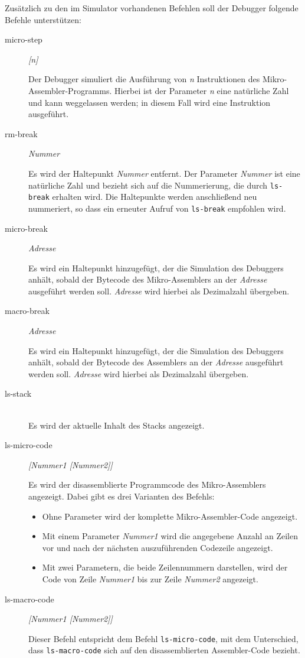Zusätzlich zu den im Simulator vorhandenen Befehlen soll der Debugger folgende Befehle unterstützen:
\begin{description}
\item[micro-step] \emph{[n]}

Der Debugger simuliert die Ausführung von \emph{n} Instruktionen des Mikro-Assembler-Programms. Hierbei ist der Parameter \emph{n} eine natürliche Zahl und kann weggelassen werden; in diesem Fall wird eine Instruktion ausgeführt.

\item[rm-break] \emph{Nummer}

Es wird der Haltepunkt \emph{Nummer} entfernt. Der Parameter \emph{Nummer} ist eine natürliche Zahl und bezieht sich auf die Nummerierung, die durch \texttt{ls-break} erhalten wird. Die Haltepunkte werden anschließend neu nummeriert, so dass ein erneuter Aufruf von \texttt{ls-break} empfohlen wird.

\item[micro-break] \emph{Adresse}

Es wird ein Haltepunkt hinzugefügt, der die Simulation des Debuggers anhält, sobald der Bytecode des Mikro-Assemblers an der \emph{Adresse} ausgeführt werden soll. \emph{Adresse} wird hierbei als Dezimalzahl übergeben.

\item[macro-break] \emph{Adresse}

Es wird ein Haltepunkt hinzugefügt, der die Simulation des Debuggers anhält, sobald der Bytecode des Assemblers an der \emph{Adresse} ausgeführt werden soll. \emph{Adresse} wird hierbei als Dezimalzahl übergeben.

\item[ls-stack] \hspace*{\fill}\\

Es wird der aktuelle Inhalt des Stacks angezeigt.

\item[ls-micro-code] \emph{[Nummer1 [Nummer2]]}

Es wird der disassemblierte Programmcode des Mikro-Assemblers angezeigt. Dabei gibt es drei Varianten des Befehls:
\begin{itemize}
\item Ohne Parameter wird der komplette Mikro-Assembler-Code angezeigt.
\item Mit einem Parameter \emph{Nummer1} wird die angegebene Anzahl an Zeilen vor und nach der nächsten auszuführenden Codezeile angezeigt.
\item Mit zwei Parametern, die beide Zeilennummern darstellen, wird der Code von Zeile \emph{Nummer1} bis zur Zeile \emph{Nummer2} angezeigt. 
\end{itemize}

\item[ls-macro-code] \emph{[Nummer1 [Nummer2]]}

Dieser Befehl entspricht dem Befehl \texttt{ls-micro-code}, mit dem Unterschied, dass \texttt{ls-macro-code} sich auf den disassemblierten Assembler-Code bezieht.

\end{description}

